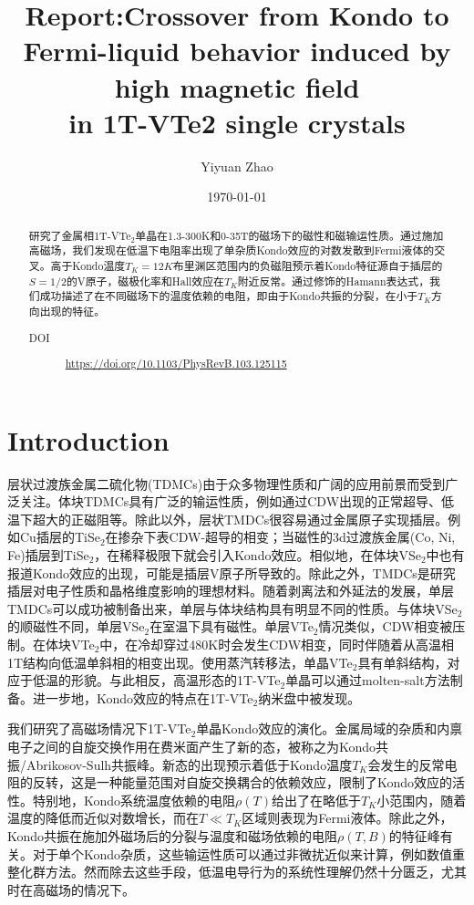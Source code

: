 \documentclass[reprint, aps, prb, showkeys]{revtex4-2}
\begin{document}
\title{Report:Crossover from Kondo to Fermi-liquid behavior induced by high magnetic field \\
in 1T-VTe2 single crystals}

\author{Yiyuan Zhao}
\date{\today}

\begin{abstract}
研究了金属相1T-VTe$_2$单晶在1.3-300K和0-35T的磁场下的磁性和磁输运性质。通过施加高磁场，我们发现在低温下电阻率出现了单杂质Kondo效应的对数发散到Fermi液体的交叉。高于Kondo温度$T_K = 12 K$布里渊区范围内的负磁阻预示着Kondo特征源自于插层的$S = 1/2$的V原子，磁极化率和Hall效应在$T_K$附近反常。通过修饰的Hamann表达式，我们成功描述了在不同磁场下的温度依赖的电阻，即由于Kondo共振的分裂，在小于$T_K$方向出现的特征。
\begin{description}
    \item[DOI] \url{https://doi.org/10.1103/PhysRevB.103.125115}
\end{description}
\end{abstract}


\maketitle

\section{Introduction}
层状过渡族金属二硫化物(TDMCs)由于众多物理性质和广阔的应用前景而受到广泛关注。体块TDMCs具有广泛的输运性质，例如通过CDW出现的正常超导、低温下超大的正磁阻等。除此以外，层状TMDCs很容易通过金属原子实现插层。例如Cu插层的TiSe$_2$在掺杂下表CDW-超导的相变；当磁性的3d过渡族金属(Co, Ni, Fe)插层到TiSe$_2$，在稀释极限下就会引入Kondo效应。相似地，在体块VSe$_2$中也有报道Kondo效应的出现，可能是插层V原子所导致的。除此之外，TMDCs是研究插层对电子性质和晶格维度影响的理想材料。随着剥离法和外延法的发展，单层TMDCs可以成功被制备出来，单层与体块结构具有明显不同的性质。与体块VSe$_2$的顺磁性不同，单层VSe$_2$在室温下具有磁性。单层VTe$_2$情况类似，CDW相变被压制。在体块VTe$_2$中，在冷却穿过480K时会发生CDW相变，同时伴随着从高温相1T结构向低温单斜相的相变出现。使用蒸汽转移法，单晶VTe$_2$具有单斜结构，对应于低温的形貌。与此相反，高温形态的1T-VTe$_2$单晶可以通过molten-salt方法制备。进一步地，Kondo效应的特点在1T-VTe$_2$纳米盘中被发现。

我们研究了高磁场情况下1T-VTe$_2$单晶Kondo效应的演化。金属局域的杂质和内禀电子之间的自旋交换作用在费米面产生了新的态，被称之为Kondo共振/Abrikosov-Sulh共振峰。新态的出现预示着低于Kondo温度$T_K$会发生的反常电阻的反转，这是一种能量范围对自旋交换耦合的依赖效应，限制了Kondo效应的活性。特别地，Kondo系统温度依赖的电阻$\rho(T)$给出了在略低于$T_K$小范围内，随着温度的降低而近似对数增长，而在$T \ll T_K$区域则表现为Fermi液体。除此之外，Kondo共振在施加外磁场后的分裂与温度和磁场依赖的电阻$\rho(T, B)$的特征峰有关。对于单个Kondo杂质，这些输运性质可以通过非微扰近似来计算，例如数值重整化群方法。然而除去这些手段，低温电导行为的系统性理解仍然十分匮乏，尤其时在高磁场的情况下。
\end{document}
